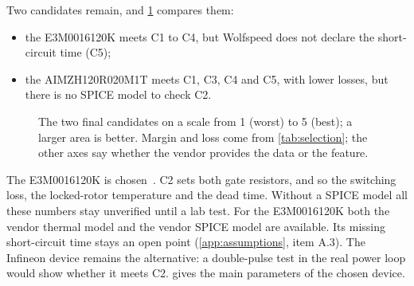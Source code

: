 Two candidates remain, and \cref{fig:radar-candidates} compares them:
\begin{itemize}
  \item the E3M0016120K meets C1 to C4, but Wolfspeed does not declare the
        short-circuit time (C5);
  \item the AIMZH120R020M1T meets C1, C3, C4 and C5, with lower losses, but
        there is no SPICE model to check C2.
\end{itemize}

\begin{figure}[H]
\centering

\caption{The two final candidates on a scale from 1 (worst) to 5 (best); a larger area is better.
Margin and loss come from \cref{tab:selection}; the other axes say whether
the vendor provides the data or the feature.}
\label{fig:radar-candidates}
\end{figure}

The E3M0016120K is chosen~\cite{wolfspeed_e3m0016}. C2 sets both gate
resistors, and so the switching loss, the locked-rotor temperature and the
dead time. Without a SPICE model all these numbers stay unverified until a
lab test. For the E3M0016120K both the vendor thermal model and the vendor
SPICE model are available. Its missing short-circuit time stays an open point
(\cref{app:assumptions}, item A.3). The Infineon device remains the alternative: a
double-pulse test in the real power loop would show whether it meets C2.
 gives the main parameters of the chosen device.

